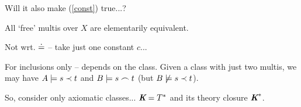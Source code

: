 \documentclass[10pt]{article}
\begin{document}
Will it also make (\ref{const}) true...?
\begin{Claim} All `free' multis over $X$ are elementarily equivalent.
\end{Claim}
Not wrt. $\mathrel{\doteq}$ -- take just one constant $c$...

For inclusions only -- depends on the class. Given a class with just two
multis, we may have $A\models s\mathrel{\prec} t$ and $B\models s\mathrel{\frown} t$ (but
$B\not\models s\mathrel{\prec} t$).

So, consider only axiomatic classes... $\mbox{\bf\em K}=T^*$ and its theory closure $\mbox{\bf\em K}^*$.



\end{document}
